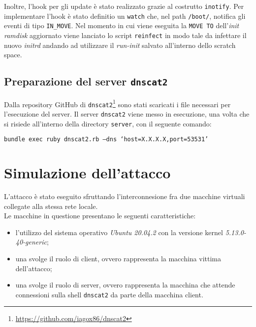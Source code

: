 \documentclass[oneside]{article}
\begin{document}
Inoltre, l'hook per gli update è stato realizzato grazie al costrutto \texttt{inotify}. Per implementare l'hook è stato definitio un \texttt{watch} che, nel path \texttt{/boot/}, notifica gli eventi di tipo \texttt{IN\_MOVE}. Nel momento in cui viene eseguita la \texttt{MOVE TO} dell'\textit{init ramdisk} aggiornato viene lanciato lo script \texttt{reinfect} in modo tale da infettare il nuovo \textit{initrd} andando ad utilizzare il \textit{run-init} salvato all'interno dello scratch space.

\subsection{Preparazione del server \texttt{dnscat2}}
Dalla repository GitHub di \texttt{dnscat2}\footnote{\url{https://github.com/iagox86/dnscat2}} sono stati scaricati i file necessari per l'esecuzione del server. Il server \texttt{dnscat2} viene messo in esecuzione, una volta che si risiede all'interno della directory \texttt{server}, con il seguente comando:
\begin{center}
\texttt{bundle exec ruby dnscat2.rb --dns `host=X.X.X.X,port=53531'}
\end{center}

\section{Simulazione dell'attacco}
L'attacco è stato eseguito sfruttando l'interconnesione fra due macchine virtuali collegate alla stessa rete locale.\\ Le macchine in questione presentano le seguenti caratteristiche: 
\begin{itemize}
\item l'utilizzo del sistema operativo \textit{Ubuntu 20.04.2} con la versione kernel \textit{5.13.0-40-generic};
\item una svolge il ruolo di client, ovvero rappresenta la macchina vittima dell'attacco;
\item una svolge il ruolo di server, ovvero rappresenta la macchina che attende connessioni sulla shell \texttt{dnscat2} da parte della macchina client.
\end{itemize}
\end{document}
